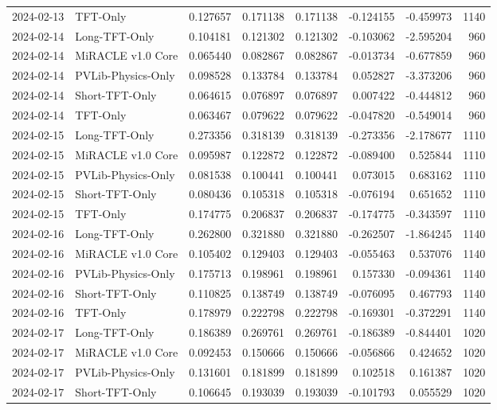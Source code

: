 \begin{tabular}{llrrrrrr}
2024-02-13 & TFT-Only & 0.127657 & 0.171138 & 0.171138 & -0.124155 & -0.459973 & 1140 \\
2024-02-14 & Long-TFT-Only & 0.104181 & 0.121302 & 0.121302 & -0.103062 & -2.595204 & 960 \\
2024-02-14 & MiRACLE v1.0 Core & 0.065440 & 0.082867 & 0.082867 & -0.013734 & -0.677859 & 960 \\
2024-02-14 & PVLib-Physics-Only & 0.098528 & 0.133784 & 0.133784 & 0.052827 & -3.373206 & 960 \\
2024-02-14 & Short-TFT-Only & 0.064615 & 0.076897 & 0.076897 & 0.007422 & -0.444812 & 960 \\
2024-02-14 & TFT-Only & 0.063467 & 0.079622 & 0.079622 & -0.047820 & -0.549014 & 960 \\
2024-02-15 & Long-TFT-Only & 0.273356 & 0.318139 & 0.318139 & -0.273356 & -2.178677 & 1110 \\
2024-02-15 & MiRACLE v1.0 Core & 0.095987 & 0.122872 & 0.122872 & -0.089400 & 0.525844 & 1110 \\
2024-02-15 & PVLib-Physics-Only & 0.081538 & 0.100441 & 0.100441 & 0.073015 & 0.683162 & 1110 \\
2024-02-15 & Short-TFT-Only & 0.080436 & 0.105318 & 0.105318 & -0.076194 & 0.651652 & 1110 \\
2024-02-15 & TFT-Only & 0.174775 & 0.206837 & 0.206837 & -0.174775 & -0.343597 & 1110 \\
2024-02-16 & Long-TFT-Only & 0.262800 & 0.321880 & 0.321880 & -0.262507 & -1.864245 & 1140 \\
2024-02-16 & MiRACLE v1.0 Core & 0.105402 & 0.129403 & 0.129403 & -0.055463 & 0.537076 & 1140 \\
2024-02-16 & PVLib-Physics-Only & 0.175713 & 0.198961 & 0.198961 & 0.157330 & -0.094361 & 1140 \\
2024-02-16 & Short-TFT-Only & 0.110825 & 0.138749 & 0.138749 & -0.076095 & 0.467793 & 1140 \\
2024-02-16 & TFT-Only & 0.178979 & 0.222798 & 0.222798 & -0.169301 & -0.372291 & 1140 \\
2024-02-17 & Long-TFT-Only & 0.186389 & 0.269761 & 0.269761 & -0.186389 & -0.844401 & 1020 \\
2024-02-17 & MiRACLE v1.0 Core & 0.092453 & 0.150666 & 0.150666 & -0.056866 & 0.424652 & 1020 \\
2024-02-17 & PVLib-Physics-Only & 0.131601 & 0.181899 & 0.181899 & 0.102518 & 0.161387 & 1020 \\
2024-02-17 & Short-TFT-Only & 0.106645 & 0.193039 & 0.193039 & -0.101793 & 0.055529 & 1020 \\

\end{tabular}
